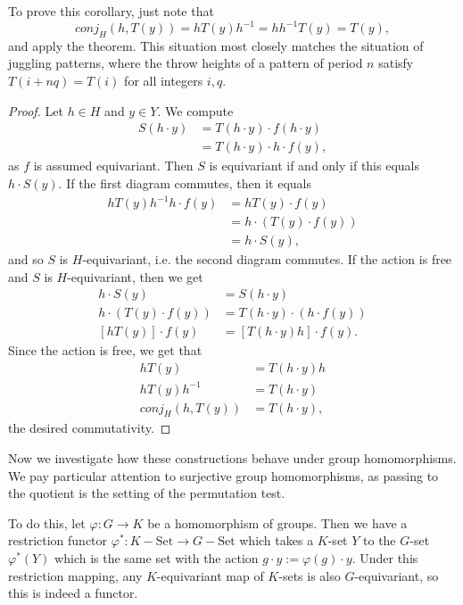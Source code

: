 \documentclass[12nt]{article}
\theoremstyle{plain}
\begin{document}
To prove this corollary, just note that \[
conj_H(h, T(y)) = hT(y)h^{-1} = hh^{-1}T(y) = T(y),
\]
and apply the theorem. This situation most closely matches the situation of juggling patterns, where the throw heights of a pattern of period $n$ satisfy \newline $T(i + nq) = T(i)$ for all integers $i, q$. 

\begin{proof}
Let $h \in H$ and $y \in Y$. We compute
\begin{align*}
S(h \cdot y) &= T(h \cdot y) \cdot f(h \cdot y) \\
	&= T(h \cdot y) \cdot h \cdot f(y),
\end{align*}
as $f$ is assumed equivariant. Then $S$ is equivariant if and only if this equals $h \cdot S(y)$. If the first diagram commutes, then it equals 
\begin{align*}
hT(y)h^{-1}h \cdot f(y) &= hT(y) \cdot f(y) \\
	&= h \cdot (T(y) \cdot f(y)) \\
	&= h \cdot S(y),
\end{align*}
and so $S$ is $H$-equivariant, i.e. the second diagram commutes. If the action is free and $S$ is $H$-equivariant, then we get 
\begin{align*}
h \cdot S(y) &= S(h \cdot y) \\
h \cdot (T(y) \cdot f(y)) &= T(h \cdot y) \cdot (h \cdot f(y)) \\
[hT(y)] \cdot f(y) &= [T(h \cdot y)h] \cdot f(y).
\end{align*}
Since the action is free, we get that 
\begin{align*}
hT(y) &= T(h \cdot y) h \\
hT(y)h^{-1} &= T(h \cdot y) \\
conj_H(h, T(y)) &= T(h \cdot y),
\end{align*}
the desired commutativity. 
\end{proof}

Now we investigate how these constructions behave under group homomorphisms. We pay particular attention to surjective group homomorphisms, as passing to the quotient is the setting of the permutation test.

To do this, let $\varphi : G \to K$ be a homomorphism of groups. Then we have a restriction functor $\varphi^* : K-\text{Set} \to G-\text{Set}$ which takes a $K$-set $Y$ to the $G$-set $\varphi^*(Y)$ which is the same set with the action $g \cdot y := \varphi(g) \cdot y$. Under this restriction mapping, any $K$-equivariant map of $K$-sets is also $G$-equivariant, so this is indeed a functor. 
\end{document}
